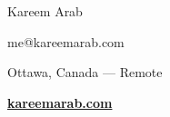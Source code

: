 \documentclass[9pt]{article}
\begin{document}
    \begin{changemargin}{2cm}{-2cm}
        \begin{center}
        {\huge Kareem Arab}\par\smallskip\smallskip

        \begin{minipage}[b]{0.33333\textwidth}
        \centering
            me@kareemarab.com  \par
            Ottawa, Canada --- Remote\par
            \textbf{\href{http://kareemarab.com}{kareemarab.com}}
        \end{minipage}
        \end{center}
    \end{changemargin}
\end{document}
